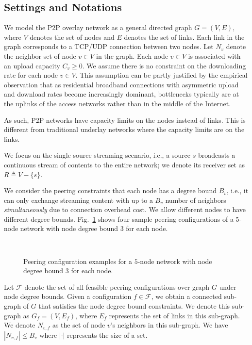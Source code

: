 \documentclass[10pt,conference]{IEEEtran}
\begin{document}
\label{sec:prob.formulation}


\subsection{Settings and Notations}

We model the P2P overlay network as a general directed graph $G=(V,E)$, where
\emph{$V$} denotes the set of nodes and \emph{$E$} denotes the set
of links. Each link in the graph corresponds to a TCP/UDP
connection between two nodes. Let $N_{v}$ denote the neighbor set of node $v\in V$ in the graph. Each node $v\in V$ is associated
with an upload capacity $C_{v}\ge0$. We assume there is no constraint on the downloading
rate for each node $v\in V$. This assumption can be partly justified
by the empirical observation that as residential broadband
connections with asymmetric upload and download rates become increasingly dominant, bottlenecks
typically are at the uplinks of the access networks rather than
in the middle of the Internet.

As such, P2P networks have capacity limits on the nodes instead of links. This is different from traditional underlay networks where the capacity limits are on the links.

We focus on the single-source streaming scenario, i.e., a source
$s$ broadcasts a continuous stream of contents to the entire network; we
denote its receiver set as $R\triangleq V-\{s\}$.

We consider the peering constraints that each node has a degree bound
$B_{v}$, i.e., it can only exchange streaming content
with up to a $B_v$ number of neighbors \emph{simultaneously} due to connection overhead cost.
We allow different nodes to have different degree bounds.
Fig.~\ref{fig:pc} shows four sample peering configurations of a $5$-node
network with node degree bound $3$ for each node.

\begin{figure}[hbt!]
\centering
{}
\\
\caption{Peering configuration examples for a $5$-node network with node degree bound $3$ for each node.}
\label{fig:pc}
\end{figure}

Let $\mathcal{F}$ denote the set of all feasible peering configurations
over graph $G$ under node degree bounds. Given a configuration $f\in\mathcal{F}$, we obtain a
connected sub-graph of $G$ that satisfies the node degree bound constraints. We denote this sub-graph as $G_{f}=\left(V,E_{f}\right)$, where $E_{f}$
represents the set of links in this sub-graph. We denote $N_{v,f}$
as the set of node $v$'s neighbors in this sub-graph. We have $|N_{v,f}|\leq B_{v}$
where $|\cdot|$ represents the size of a set.
\end{document}
